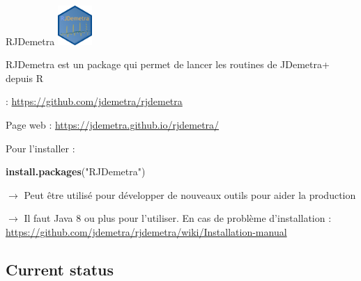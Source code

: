 \documentclass[10pt,xcolor=table,color={dvipsnames,usenames},ignorenonframetext,usepdftitle=false,french]{beamer}
\newenvironment{Shaded}{\begin{snugshade}}{\end{snugshade}}
\newcommand{\KeywordTok}[1]{\textcolor[rgb]{0.13,0.29,0.53}{\textbf{#1}}}
\newcommand{\NormalTok}[1]{#1}
\newcommand{\StringTok}[1]{\textcolor[rgb]{0.31,0.60,0.02}{#1}}
\begin{document}
\begin{frame}[fragile]{RJDemetra
\includegraphics[height = 1.5cm]{img/rjdemetra_logo.png}}
\protect\hypertarget{rjdemetra}{}

RJDemetra est un package qui permet de lancer les routines de JDemetra+
depuis R

\large\faGithub\normalsize : \url{https://github.com/jdemetra/rjdemetra}

Page web : \url{https://jdemetra.github.io/rjdemetra/}

Pour l'installer :

\begin{Shaded}
\begin{Highlighting}[]
\KeywordTok{install.packages}\NormalTok{(}\StringTok{"RJDemetra"}\NormalTok{)}
\end{Highlighting}
\end{Shaded}

\(\rightarrow\) Peut être utilisé pour développer de nouveaux outils
pour aider la production

\(\rightarrow\) Il faut Java 8 ou plus pour l'utiliser. En cas de
problème d'installation :
\url{https://github.com/jdemetra/rjdemetra/wiki/Installation-manual}

\end{frame}

\hypertarget{current-status}{%
\subsection{Current status}\label{current-status}}
\end{document}
